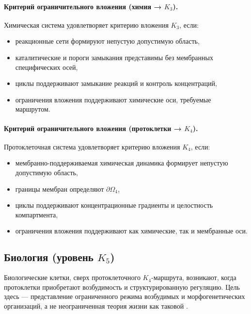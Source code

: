 \paragraph{Критерий ограничительного вложения (химия → \texorpdfstring{$K_3$}{K3}).}
Химическая система удовлетворяет критерию вложения \(K_3\), если:
\begin{itemize}
  \item реакционные сети формируют непустую допустимую область,
  \item каталитические и пороги замыкания представимы без мембранных
        специфических осей,
  \item циклы поддерживают замыкание реакций и контроль концентраций,
  \item ограничения вложения поддерживают химические оси, требуемые
        маршрутом.
\end{itemize}

\paragraph{Критерий ограничительного вложения (протоклетки →
            \texorpdfstring{$K_4$}{K4}).}
Протоклеточная система удовлетворяет критерию вложения \(K_4\), если:
\begin{itemize}
  \item мембранно-поддерживаемая химическая динамика формирует
        непустую допустимую область,
  \item границы мембран определяют \(\partial\Omega_4\),
  \item циклы поддерживают концентрационные градиенты и целостность
        компартмента,
  \item ограничения вложения поддерживают как химические, так и мембранные
        оси.
\end{itemize}

\subsection{Биология (уровень \texorpdfstring{$K_5$}{K5})}

Биологические клетки, сверх протоклеточного \(K_4\)-маршрута, возникают,
когда протоклетки приобретают возбудимость и структурированную регуляцию.
Цель здесь — представление ограниченного режима возбудимых и морфогенетических
организаций, а не неограниченная теория жизни как таковой
\parencite{turing_morphogenesis,hopfield_nn}.

